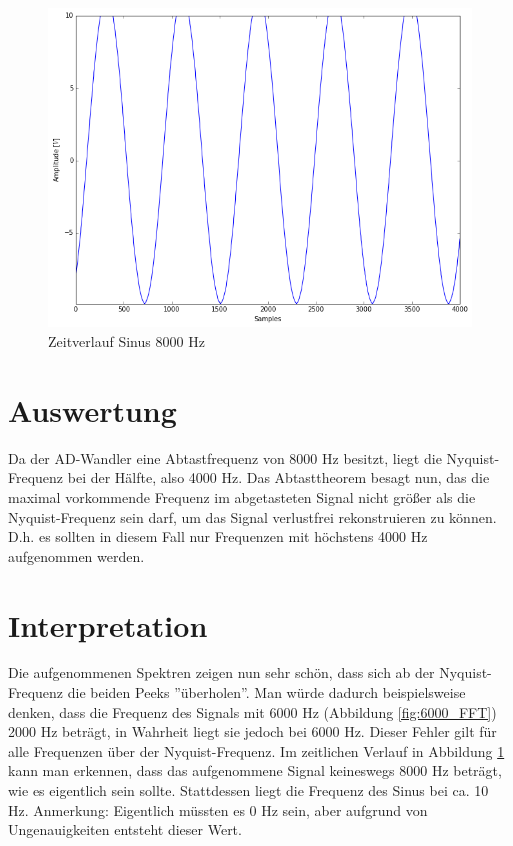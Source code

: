 \documentclass[12pt,oneside,a4paper]{report}
\begin{document}
\begin{figure}[H]
\centering\small
\includegraphics[scale=0.4]{src/Sinus8000Hz.png}
\caption{Zeitverlauf Sinus 8000 Hz}
\label{fig:8000_TIME}
\end{figure}

\section{Auswertung}
\label{chap:VERSUCH_4_AUSWERTUNG}

Da der AD-Wandler eine Abtastfrequenz von 8000 Hz besitzt, liegt die Nyquist-Frequenz bei der Hälfte, also 4000 Hz.
Das Abtasttheorem besagt nun, das die maximal vorkommende Frequenz im abgetasteten Signal nicht größer als die Nyquist-Frequenz sein darf, um das Signal verlustfrei rekonstruieren zu können. D.h. es sollten in diesem Fall nur Frequenzen mit höchstens 4000 Hz aufgenommen werden.

\section{Interpretation}
\label{chap:VERSUCH_4_INTERPRETATION}

Die aufgenommenen Spektren zeigen nun sehr schön, dass sich ab der Nyquist-Frequenz die beiden Peeks ''überholen''.
Man würde dadurch beispielsweise denken, dass die Frequenz des Signals mit 6000 Hz (Abbildung \ref{fig:6000_FFT}) 2000 Hz beträgt, in Wahrheit liegt sie jedoch bei 6000 Hz.
Dieser Fehler gilt für alle Frequenzen über der Nyquist-Frequenz.
Im zeitlichen Verlauf in Abbildung \ref{fig:8000_TIME} kann man erkennen, dass das aufgenommene Signal keineswegs 8000 Hz beträgt, wie es eigentlich sein sollte. Stattdessen liegt die Frequenz des Sinus bei ca. 10 Hz.
Anmerkung: Eigentlich müssten es 0 Hz sein, aber aufgrund von Ungenauigkeiten entsteht dieser Wert.
\end{document}
